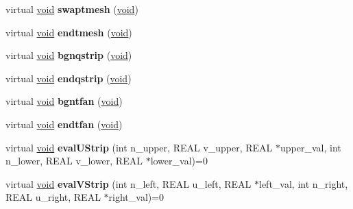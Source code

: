 \begin{DoxyCompactItemize}
\item 
\mbox{\label{class_basic_surface_evaluator_acf0fde5774c78c50ce0fdc05d8e3dccb}} 
virtual \hyperlink{interfacevoid}{void} {\bfseries swaptmesh} (\hyperlink{interfacevoid}{void})
\item 
\mbox{\label{class_basic_surface_evaluator_ae09138926aa2c3e420f2fc75af05cb11}} 
virtual \hyperlink{interfacevoid}{void} {\bfseries endtmesh} (\hyperlink{interfacevoid}{void})
\item 
\mbox{\label{class_basic_surface_evaluator_af8233bab85654b730c10b500bf0a3e0c}} 
virtual \hyperlink{interfacevoid}{void} {\bfseries bgnqstrip} (\hyperlink{interfacevoid}{void})
\item 
\mbox{\label{class_basic_surface_evaluator_acea333f5b9886084490100258efb5fd0}} 
virtual \hyperlink{interfacevoid}{void} {\bfseries endqstrip} (\hyperlink{interfacevoid}{void})
\item 
\mbox{\label{class_basic_surface_evaluator_a4b5710e6841747c3ba80909c9f925e03}} 
virtual \hyperlink{interfacevoid}{void} {\bfseries bgntfan} (\hyperlink{interfacevoid}{void})
\item 
\mbox{\label{class_basic_surface_evaluator_aeca5ee192d68aeb65162abd099ffae8a}} 
virtual \hyperlink{interfacevoid}{void} {\bfseries endtfan} (\hyperlink{interfacevoid}{void})
\item 
\mbox{\label{class_basic_surface_evaluator_aab95d672b233ab83459547ea53217b24}} 
virtual \hyperlink{interfacevoid}{void} {\bfseries eval\+U\+Strip} (int n\+\_\+upper, R\+E\+AL v\+\_\+upper, R\+E\+AL $\ast$upper\+\_\+val, int n\+\_\+lower, R\+E\+AL v\+\_\+lower, R\+E\+AL $\ast$lower\+\_\+val)=0
\item 
\mbox{\label{class_basic_surface_evaluator_ac5dfbd8a0750d077b92d672890e64fa1}} 
virtual \hyperlink{interfacevoid}{void} {\bfseries eval\+V\+Strip} (int n\+\_\+left, R\+E\+AL u\+\_\+left, R\+E\+AL $\ast$left\+\_\+val, int n\+\_\+right, R\+E\+AL u\+\_\+right, R\+E\+AL $\ast$right\+\_\+val)=0

\end{DoxyCompactItemize}
